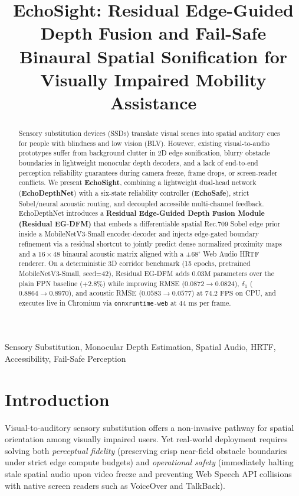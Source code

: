 \documentclass[conference]{IEEEtran}
\title{EchoSight: Residual Edge-Guided Depth Fusion and Fail-Safe Binaural Spatial Sonification for Visually Impaired Mobility Assistance}
\author{
  \IEEEauthorblockN{EchoSight Research Team}
  \IEEEauthorblockA{Project Repository: \url{https://github.com/zhud41343-alt/echosight}}
}
\begin{document}
\maketitle

\begin{abstract}
Sensory substitution devices (SSDs) translate visual scenes into spatial auditory cues for people with blindness and low vision (BLV). However, existing visual-to-audio prototypes suffer from background clutter in 2D edge sonification, blurry obstacle boundaries in lightweight monocular depth decoders, and a lack of end-to-end perception reliability guarantees during camera freeze, frame drops, or screen-reader conflicts. We present \textbf{EchoSight}, combining a lightweight dual-head network (\textbf{EchoDepthNet}) with a six-state reliability controller (\textbf{EchoSafe}), strict Sobel/neural acoustic routing, and decoupled accessible multi-channel feedback. EchoDepthNet introduces a \textbf{Residual Edge-Guided Depth Fusion Module (Residual EG-DFM)} that embeds a differentiable spatial Rec.709 Sobel edge prior inside a MobileNetV3-Small encoder-decoder and injects edge-gated boundary refinement via a residual shortcut to jointly predict dense normalized proximity maps and a $16\times 48$ binaural acoustic matrix aligned with a $\pm 68^\circ$ Web Audio HRTF renderer. On a deterministic 3D corridor benchmark (15 epochs, pretrained MobileNetV3-Small, seed=42), Residual EG-DFM adds $0.03\text{M}$ parameters over the plain FPN baseline ($+2.8\%$) while improving RMSE ($0.0872 \to 0.0824$), $\delta_1$ ($0.8864 \to 0.8970$), and acoustic RMSE ($0.0583 \to 0.0577$) at $74.2\text{ FPS}$ on CPU, and executes live in Chromium via \texttt{onnxruntime-web} at $44\text{ ms}$ per frame.
\end{abstract}

\begin{IEEEkeywords}
Sensory Substitution, Monocular Depth Estimation, Spatial Audio, HRTF, Accessibility, Fail-Safe Perception
\end{IEEEkeywords}

\section{Introduction}
Visual-to-auditory sensory substitution offers a non-invasive pathway for spatial orientation among visually impaired users. Yet real-world deployment requires solving both \emph{perceptual fidelity} (preserving crisp near-field obstacle boundaries under strict edge compute budgets) and \emph{operational safety} (immediately halting stale spatial audio upon video freeze and preventing Web Speech API collisions with native screen readers such as VoiceOver and TalkBack).
\end{document}
